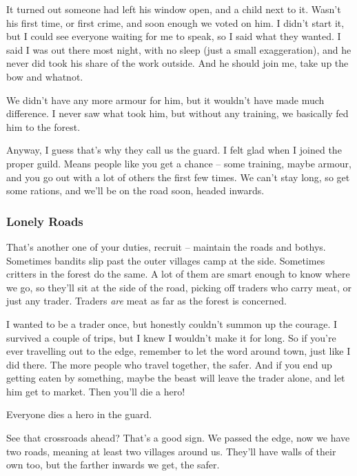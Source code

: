 \begin{multicols}{2}
\begin{exampletext}
  It turned out someone had left his window open, and a child next to it.
  Wasn't his first time, or first crime, and soon enough we voted on him.
  I didn't start it, but I could see everyone waiting for me to speak, so I said what they wanted.
  I said I was out there most night, with no sleep (just a small exaggeration), and he never did took his share of the work outside.
  And he should join me, take up the bow and whatnot.

  We didn't have any more armour for him, but it wouldn't have made much difference.
  I never saw what took him, but without any training, we basically fed him to the forest.
  
  Anyway, I guess that's why they call us the \gls{guard}.
  I felt glad when I joined the proper guild.
  Means people like you get a chance -- some training, maybe armour, and you go out with a lot of others the first few times.
  We can't stay long, so get some rations, and we'll be on the road soon, headed inwards.

  \subsubsection*{Lonely Roads}

  That's another one of your duties, recruit -- maintain the roads and \glspl{bothy}.
  Sometimes bandits slip past the outer \glspl{village} camp at the side.
  Sometimes critters in the forest do the same.
  A lot of them are smart enough to know where we go, so they'll sit at the side of the road, picking off traders who carry meat, or just any trader.
  Traders \emph{are} meat as far as the forest is concerned.

  I wanted to be a trader once, but honestly couldn't summon up the courage.
  I survived a couple of trips, but I knew I wouldn't make it for long.
  So if you're ever travelling out to the \gls{edge}, remember to let the word around town, just like I did there.
  The more people who travel together, the safer.
  And if you end up getting eaten by something, maybe the beast will leave the trader alone, and let him get to market.
  Then you'll die a hero!

  Everyone dies a hero in the \gls{guard}.

  See that crossroads ahead?
  That's a good sign.
  We passed the \gls{edge}, now we have two roads, meaning at least two \glspl{village} around us.
  They'll have walls of their own too, but the farther inwards we get, the safer.


\end{exampletext}
\end{multicols}
